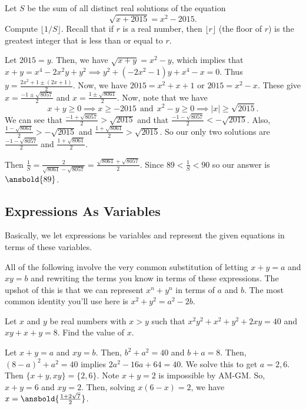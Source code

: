 \documentclass[mast]{lucky}
\begin{document}
\begin{exam}{6}
Let $S$ be the sum of all distinct real solutions of the equation 
\[\sqrt{x + 2015} = x^2 - 2015.\]
Compute $\lfloor 1/S \rfloor$.  Recall that if $r$ is a real number, then $\lfloor r \rfloor$ (the floor of $r$) is the greatest integer that is less than or equal to $r$.
\end{exam}

\begin{sol}
Let $2015=y$. Then, we have $\sqrt{x+y}=x^2-y$, which implies that $x+y=x^4-2x^2y+y^2\implies y^2+(-2x^2-1)y+x^4-x=0$. Thus $y=\frac{2x^2+1 \pm (2x+1)}{2}$. Now, we have $2015=x^2+x+1$ or $2015=x^2-x$. These give $x=\frac{-1 \pm \sqrt{8057}}{2}$ and $x=\frac{1 \pm \sqrt{8061}}{2}$. Now, note that we have
\[x+y\ge 0 \implies x \ge -2015~~\text{and}~~x^2-y\ge 0\implies |x|\ge \sqrt{2015}.\]
We can see that $\frac{-1 + \sqrt{8057}}{2}>\sqrt{2015}$ and that $\frac{-1-\sqrt{8057}}{2} < -\sqrt{2015}$. Also, $\frac{1-\sqrt{8061}}{2} > - \sqrt{2015}$ and $\frac{1+\sqrt{8061}}{2} > \sqrt{2015}$. So our only two solutions are $\frac{-1-\sqrt{8057}}{2}$ and $\frac{1+\sqrt{8061}}{2}$.

Then $\frac{1}{S}=\frac{2}{\sqrt{8061}-\sqrt{8057}}=\frac{\sqrt{8061}+\sqrt{8057}}{2}$. Since $89 < \frac{1}{S} < 90$ so our answer is $\ansbold{89}$.
\end{sol}


\subsection{Expressions As Variables}
Basically, we let expressions be variables and represent the given equations in terms of these variables.

All of the following involve the very common substitution of letting $x+y=a$ and $xy=b$ and rewriting the terms you know in terms of these expressions. The upshot of this is that we can represent $x^{n}+y^{n}$ in terms of $a$ and $b$. The most common identity you'll use here is $x^2+y^2=a^2-2b$.

\begin{exam}
Let $x$ and $y$ be real numbers with $x > y$ such that $x^2 y^2 + x^2 + y^2 + 2xy = 40$ and $xy + x + y = 8$. Find
the value of $x$.
\end{exam}
\begin{sol}
Let $x+y=a$ and $xy=b$. Then, $b^2+a^2=40$ and $b+a=8$. Then, $(8-a)^2+a^2=40$ implies $2a^2-16a+64=40$. We solve this to get $a=2,6$. Then $\{x+y,xy\}=\{2,6\}$. Note $x+y=2$ is impossible by AM-GM. So, $x+y=6$ and $xy=2$. Then, solving $x(6-x)=2$, we have $x=\ansbold{\frac{1+2\sqrt{7}}{2}}$.
\end{sol}
\end{document}
